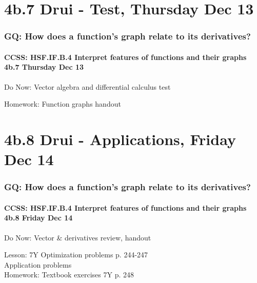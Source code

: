 \documentclass{beamer}
\begin{document}
  \section{4b.7 Drui - Test, Thursday Dec 13}
    \frame
    {\frametitle{GQ: How does a function's graph relate to its derivatives?}
      \framesubtitle{CCSS: HSF.IF.B.4 Interpret features of functions and their graphs \quad \alert{4b.7 Thursday Dec 13}}

      \begin{block}{Do Now: Vector algebra and differential calculus test}
      \end{block}

      Homework: Function graphs handout
    }

\section{4b.8 Drui - Applications, Friday Dec 14}
  \frame
  {\frametitle{GQ: How does a function's graph relate to its derivatives?}
    \framesubtitle{CCSS: HSF.IF.B.4 Interpret features of functions and their graphs \quad \alert{4b.8 Friday Dec 14}}

    \begin{block}{Do Now:  Vector \& derivatives review, handout}
    \end{block}
    Lesson: 7Y Optimization problems p. 244-247\\
    Application problems\\ \bigskip
    Homework: Textbook exercises 7Y p. 248
  }
\end{document}

